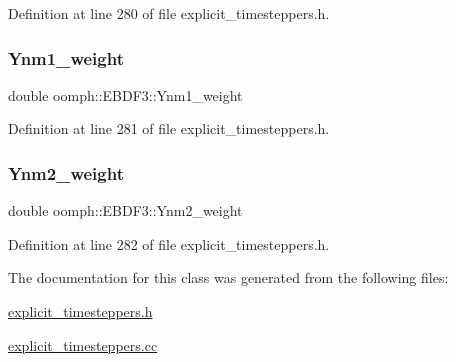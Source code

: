 Definition at line 280 of file explicit\+\_\+timesteppers.\+h.

\mbox{\label{classoomph_1_1EBDF3_ab0bdca19eac51af44469035ad9ccd3a1}} 
\subsubsection{\texorpdfstring{Ynm1\+\_\+weight}{Ynm1\_weight}}
{\footnotesize\ttfamily double oomph\+::\+E\+B\+D\+F3\+::\+Ynm1\+\_\+weight\hspace{0.3cm}{\ttfamily [private]}}



Definition at line 281 of file explicit\+\_\+timesteppers.\+h.

\mbox{\label{classoomph_1_1EBDF3_a4f4bf6b76694fc89cbf516a2388cff00}} 
\subsubsection{\texorpdfstring{Ynm2\+\_\+weight}{Ynm2\_weight}}
{\footnotesize\ttfamily double oomph\+::\+E\+B\+D\+F3\+::\+Ynm2\+\_\+weight\hspace{0.3cm}{\ttfamily [private]}}



Definition at line 282 of file explicit\+\_\+timesteppers.\+h.



The documentation for this class was generated from the following files\+:\begin{DoxyCompactItemize}
\item 
\hyperlink{explicit__timesteppers_8h}{explicit\+\_\+timesteppers.\+h}\item 
\hyperlink{explicit__timesteppers_8cc}{explicit\+\_\+timesteppers.\+cc}\end{DoxyCompactItemize}
